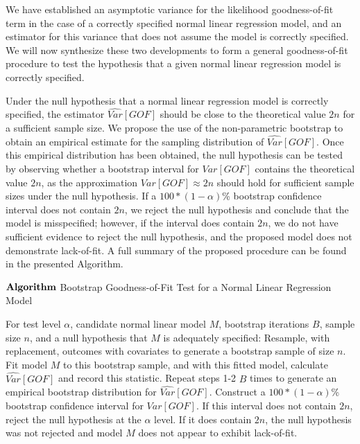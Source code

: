 \documentclass[12pt]{article} %
\theoremstyle{definition}
\begin{document}
		We have established an asymptotic variance for the likelihood goodness-of-fit term in the case of a correctly specified normal linear regression model, and an
		estimator for this variance that does not assume the model is correctly specified. We will now synthesize these two developments to form a general goodness-of-fit procedure to
		test the hypothesis that a given normal linear regression model is correctly specified.

		Under the null hypothesis that a normal linear regression model is correctly specified, the estimator $\widehat{Var}[GOF]$ should be close to the theoretical value $2n$ for a
		sufficient sample size. We propose the use of the non-parametric bootstrap to obtain an empirical estimate for the sampling distribution of $\widehat{Var}[GOF]$. Once this empirical distribution
		has been obtained, the null hypothesis can be tested by observing whether a bootstrap interval for $Var[GOF]$ contains the theoretical value $2n$, as the approximation
		$Var[GOF] \approx 2n$ should hold for sufficient sample sizes under the null hypothesis. If a $100*(1-\alpha)$\% bootstrap confidence interval does not contain 
		$2n$, we reject the null hypothesis and conclude that the model is misspecified; however, if the interval does contain $2n$, we do not have sufficient evidence to reject
		the null hypothesis, and the proposed model does not demonstrate lack-of-fit. A full summary of the proposed procedure can be found in the presented Algorithm.
		\begin{algorithm*}[h]
			\caption*{$\bf{Algorithm}$ Bootstrap Goodness-of-Fit Test for a Normal Linear Regression Model}
			\begin{algorithmic}[1]
			  \Statex For test level $\alpha$, candidate normal linear model $M$, bootstrap iterations $B$, sample size $n$, and a null hypothesis that $M$
			  is adequately specified:
			  \State Resample, with replacement, outcomes with covariates to generate a bootstrap sample of size $n$.
			  \State Fit model $M$ to this bootstrap sample, and with this fitted model, calculate $\widehat{Var}[GOF]$
			  and record this statistic.
			  \State Repeat steps 1-2 $B$ times to generate an empirical bootstrap distribution for $\widehat{Var}[GOF]$.
			  \State Construct a $100*(1-\alpha)$\% bootstrap confidence interval for $Var[GOF]$.
			  \State If this interval does not contain $2n$, reject the null hypothesis at the $\alpha$ level. If it does contain
			  $2n$, the null hypothesis was not rejected and model $M$ does not appear to exhibit lack-of-fit. 
			\end{algorithmic}
		\end{algorithm*}
\end{document}
